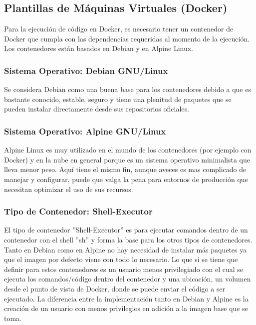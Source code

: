 \subsection{Plantillas de Máquinas Virtuales (Docker)}
Para la ejecución de código en Docker, es necesario tener un contenedor de Docker que cumpla con las dependencias requeridas al momento de la ejecución. Los contenedores están basados en Debian y en Alpine Linux.

\subsubsection{Sistema Operativo: Debian GNU/Linux}
Se considera Debian como una buena base para los contenedores debido a que es bastante conocido, estable, seguro y tiene una plenitud de paquetes que se pueden instalar directamente desde sus repositorios oficiales.

\subsubsection{Sistema Operativo: Alpine GNU/Linux}
Alpine Linux es muy utilizado en el mundo de los contenedores (por ejemplo con Docker) y en la nube en general porque es un sistema operativo minimalista que lleva menor peso. Aquí tiene el mismo fin, aunque aveces es mas complicado de manejar y configurar, puede que valga la pena para entornos de producción que necesitan optimizar el uso de sus recursos.

\subsubsection{Tipo de Contenedor: Shell-Executor}
El tipo de contenedor ''Shell-Executor'' es para ejecutar comandos dentro de un contenedor con el shell ''sh'' y forma la base para los otros tipos de contenedores. Tanto en Debian como en Alpine no hay necesidad de instalar más paquetes ya que el imagen por defecto viene con todo lo necesario. Lo que si se tiene que definir para estos contenedores es un usuario menos privilegiado con el cual se ejecuta los comandos/código dentro del contenedor y una ubicación, un volumen desde el punto de vista de Docker, donde se puede enviar el código a ser ejecutado. La diferencia entre la implementación tanto en Debian y Alpine es la creación de un usuario con menos privilegios en adición a la imagen base que se toma. 


